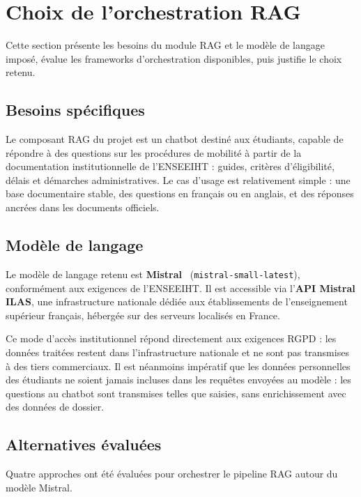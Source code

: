 \section{Choix de l'orchestration RAG}

Cette section présente les besoins du module RAG et le modèle de langage
imposé, évalue les frameworks d'orchestration disponibles, puis justifie
le choix retenu.

\subsection{Besoins spécifiques}

Le composant RAG du projet est un chatbot destiné aux étudiants, capable
de répondre à des questions sur les procédures de mobilité à partir de
la documentation institutionnelle de l'ENSEEIHT : guides, critères
d'éligibilité, délais et démarches administratives. Le cas d'usage est
relativement simple : une base documentaire stable, des questions en
français ou en anglais, et des réponses ancrées dans les documents officiels.

\subsection{Modèle de langage}

Le modèle de langage retenu est \textbf{Mistral}~\cite{mistral_dev}
(\texttt{mistral-small-latest}), conformément aux exigences de l'ENSEEIHT.
Il est accessible via l'\textbf{API Mistral ILAS}, une infrastructure
nationale dédiée aux établissements de l'enseignement supérieur français,
hébergée sur des serveurs localisés en France.

Ce mode d'accès institutionnel répond directement aux exigences RGPD :
les données traitées restent dans l'infrastructure nationale et ne sont
pas transmises à des tiers commerciaux. Il est néanmoins impératif que
les données personnelles des étudiants ne soient jamais incluses dans
les requêtes envoyées au modèle : les questions au chatbot sont
transmises telles que saisies, sans enrichissement avec des données
de dossier.


\subsection{Alternatives évaluées}

Quatre approches ont été évaluées pour orchestrer le pipeline RAG
autour du modèle Mistral.

